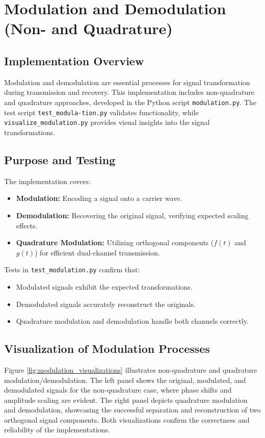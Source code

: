 \documentclass[12pt, a4paper]{report}
\begin{document}
\section{Modulation and Demodulation (Non- and Quadrature)}

\subsection{Implementation Overview}

Modulation and demodulation are essential processes for signal transformation during transmission and recovery. This implementation includes non-quadrature and quadrature approaches, developed in the Python script \texttt{modulation.py}. The test script \texttt{test\_modula-\newline tion.py} validates functionality, while \texttt{visualize\_modulation.py} provides visual insights into the signal transformations.

\subsection{Purpose and Testing}
The implementation covers:
\begin{itemize}
	\item \textbf{Modulation:} Encoding a signal onto a carrier wave.
	\item \textbf{Demodulation:} Recovering the original signal, verifying expected scaling effects.
	\item \textbf{Quadrature Modulation:} Utilizing orthogonal components (\(f(t)\) and \(g(t)\)) for efficient dual-channel transmission.
\end{itemize}

Tests in \texttt{test\_modulation.py} confirm that:
\begin{itemize}
	\item Modulated signals exhibit the expected transformations.
	\item Demodulated signals accurately reconstruct the originals.
	\item Quadrature modulation and demodulation handle both channels correctly.
\end{itemize}

\subsection{Visualization of Modulation Processes}
Figure \ref{fig:modulation_visualizations} illustrates non-quadrature and quadrature modulation/demodulation.
The left panel shows the original, modulated, and demodulated signals for the non-quadrature case,
where phase shifts and amplitude scaling are evident.
The right panel depicts quadrature modulation and demodulation,
showcasing the successful separation and reconstruction of two orthogonal signal components.
Both visualizations confirm the correctness and reliability of the implementations.
\end{document}

